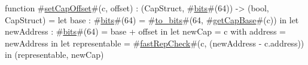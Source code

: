 function #\hyperref[zsetCapOffset]{setCapOffset}#(c, offset) : (CapStruct, #\hyperref[zbits]{bits}#(64)) -> (bool, CapStruct) =
    let base : #\hyperref[zbits]{bits}#(64)       = #\hyperref[ztozybits]{to\_bits}#(64, #\hyperref[zgetCapBase]{getCapBase}#(c)) in
    let newAddress : #\hyperref[zbits]{bits}#(64) = base + offset in
    let newCap     = { c with address = newAddress } in
    let representable = #\hyperref[zfastRepCheck]{fastRepCheck}#(c, (newAddress - c.address)) in
    (representable, newCap)
